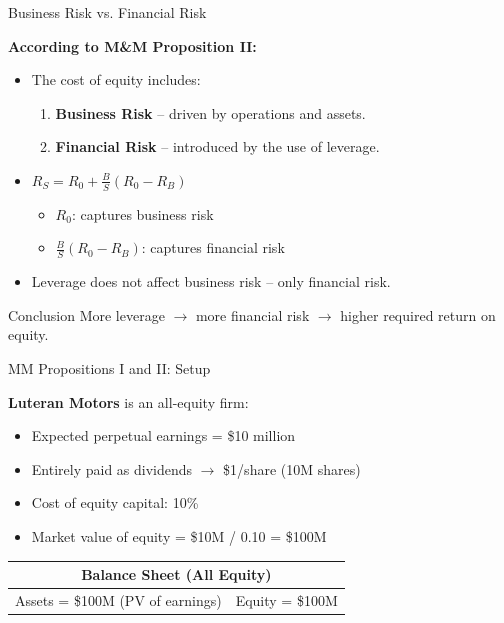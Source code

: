 \begin{frame}{Business Risk vs. Financial Risk}
	
	\textbf{According to M\&M Proposition II:}
	
	\begin{itemize}
		\item The cost of equity includes:
		\begin{enumerate}
			\item \textbf{Business Risk} -- driven by operations and assets.
			\item \textbf{Financial Risk} -- introduced by the use of leverage.
		\end{enumerate}
		
		\item \(R_S = R_0 + \frac{B}{S}(R_0 - R_B)\)
		\begin{itemize}
			\item \(R_0\): captures business risk
			\item \(\frac{B}{S}(R_0 - R_B)\): captures financial risk
		\end{itemize}
		
		\item Leverage does not affect business risk -- only financial risk.
	\end{itemize}
	
	\vspace{0.2cm}
	\begin{alertblock}{Conclusion}
		More leverage $\rightarrow$ more financial risk $\rightarrow$ higher required return on equity.
	\end{alertblock}
	
\end{frame}

\begin{frame}{MM Propositions I and II: Setup}
	
	\textbf{Luteran Motors} is an all-equity firm:
	
	\begin{itemize}
		\item Expected perpetual earnings = \$10 million
		\item Entirely paid as dividends $\rightarrow$ \$1/share (10M shares)
		\item Cost of equity capital: 10\%
		\item Market value of equity = \$10M / 0.10 = \$100M
	\end{itemize}
	
	\begin{table}
		\centering
		\begin{tabular}{@{}ll@{}}
			\toprule
			\multicolumn{2}{c}{\textbf{Balance Sheet (All Equity)}} \\ \midrule
			Assets = \$100M (PV of earnings) & Equity = \$100M \\ \bottomrule
		\end{tabular}
	\end{table}
	
\end{frame}

